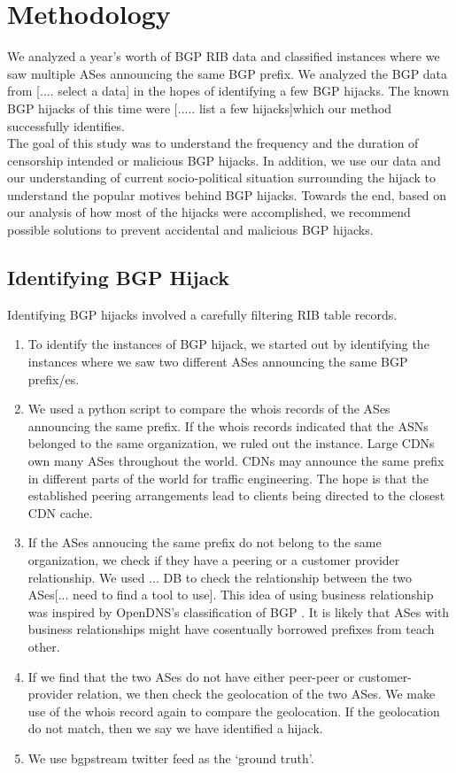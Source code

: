  \section{Methodology}\label{sec:methodology}
We analyzed a year's worth of BGP RIB data and classified instances where we saw multiple ASes announcing the same BGP prefix. We analyzed the BGP data from [.... select a data] in the hopes of identifying a few BGP hijacks. The known BGP hijacks  of this time were [..... list a few hijacks]which our method successfully  identifies. \\
The goal of this study was to understand the frequency and the duration of censorship intended or malicious BGP hijacks. In addition, we  use our data and our understanding of current socio-political situation surrounding the hijack to understand the popular motives behind BGP hijacks. Towards the end, based on our analysis of how most of the hijacks were accomplished, we recommend possible solutions to prevent accidental and malicious BGP hijacks. 
\subsection{Identifying BGP Hijack}
Identifying BGP hijacks involved a carefully filtering RIB table records. 
\begin{enumerate}
\item To identify the instances of BGP hijack, we started out by identifying the instances where we saw two different ASes announcing the same BGP prefix/es.
\item We used a python script to compare the whois records of the ASes announcing the same prefix. If the whois records indicated that the ASNs belonged to the same organization, we ruled out the instance. Large CDNs own many ASes throughout the world. CDNs may announce the same prefix in different parts of the world for traffic engineering. The hope is that the established peering arrangements lead to clients being directed to the closest CDN cache.
\item If the ASes annoucing the same prefix do not belong to the same organization, we check if they have a peering or a customer provider relationship.   We used ... DB to check the relationship between the two ASes[... need to find a tool to use]. This idea of using business relationship was inspired by OpenDNS's classification of BGP \cite{opendns_blackhat_2015}. It is likely that ASes with business relationships might have cosentually borrowed prefixes from teach other.  
\item If we find that the two ASes do not have either peer-peer or customer-provider relation, we then check the geolocation of the two ASes. We make use of the whois record again to compare the geolocation. If the geolocation do not match, then we say we have identified a hijack. 
\item We use bgpstream twitter feed as the `ground truth'. 
\end{enumerate}

